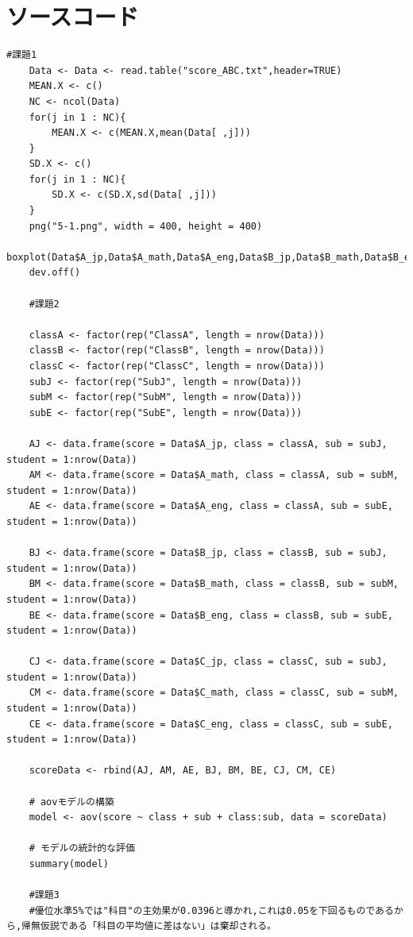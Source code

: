 \documentclass[fontsize = 10pt, paper= a4,twocolumn,column_gap=5zw]{jlreq}
\begin{document}
\section{ソースコード}
\begin{lstlisting}[basicstyle=\ttfamily\footnotesize, frame=single, caption=s2212022-1.c ,label=s2212022-1.c]
    #課題1
    Data <- Data <- read.table("score_ABC.txt",header=TRUE)
    MEAN.X <- c()
    NC <- ncol(Data)
    for(j in 1 : NC){
        MEAN.X <- c(MEAN.X,mean(Data[ ,j]))
    }
    SD.X <- c()
    for(j in 1 : NC){
        SD.X <- c(SD.X,sd(Data[ ,j]))
    }
    png("5-1.png", width = 400, height = 400)
    boxplot(Data$A_jp,Data$A_math,Data$A_eng,Data$B_jp,Data$B_math,Data$B_eng,Data$C_jp,Data$C_math,Data$C_eng)
    dev.off()
    
    #課題2
    
    classA <- factor(rep("ClassA", length = nrow(Data)))
    classB <- factor(rep("ClassB", length = nrow(Data)))
    classC <- factor(rep("ClassC", length = nrow(Data)))
    subJ <- factor(rep("SubJ", length = nrow(Data)))
    subM <- factor(rep("SubM", length = nrow(Data)))
    subE <- factor(rep("SubE", length = nrow(Data)))
    
    AJ <- data.frame(score = Data$A_jp, class = classA, sub = subJ, student = 1:nrow(Data))
    AM <- data.frame(score = Data$A_math, class = classA, sub = subM, student = 1:nrow(Data))
    AE <- data.frame(score = Data$A_eng, class = classA, sub = subE, student = 1:nrow(Data))
    
    BJ <- data.frame(score = Data$B_jp, class = classB, sub = subJ, student = 1:nrow(Data))
    BM <- data.frame(score = Data$B_math, class = classB, sub = subM, student = 1:nrow(Data))
    BE <- data.frame(score = Data$B_eng, class = classB, sub = subE, student = 1:nrow(Data))
    
    CJ <- data.frame(score = Data$C_jp, class = classC, sub = subJ, student = 1:nrow(Data))
    CM <- data.frame(score = Data$C_math, class = classC, sub = subM, student = 1:nrow(Data))
    CE <- data.frame(score = Data$C_eng, class = classC, sub = subE, student = 1:nrow(Data))
    
    scoreData <- rbind(AJ, AM, AE, BJ, BM, BE, CJ, CM, CE)
    
    # aovモデルの構築
    model <- aov(score ~ class + sub + class:sub, data = scoreData)
    
    # モデルの統計的な評価
    summary(model)
    
    #課題3
    #優位水準5%では"科目"の主効果が0.0396と導かれ,これは0.05を下回るものであるから,帰無仮説である「科目の平均値に差はない」は棄却される。
    

\end{lstlisting}
\end{document}
